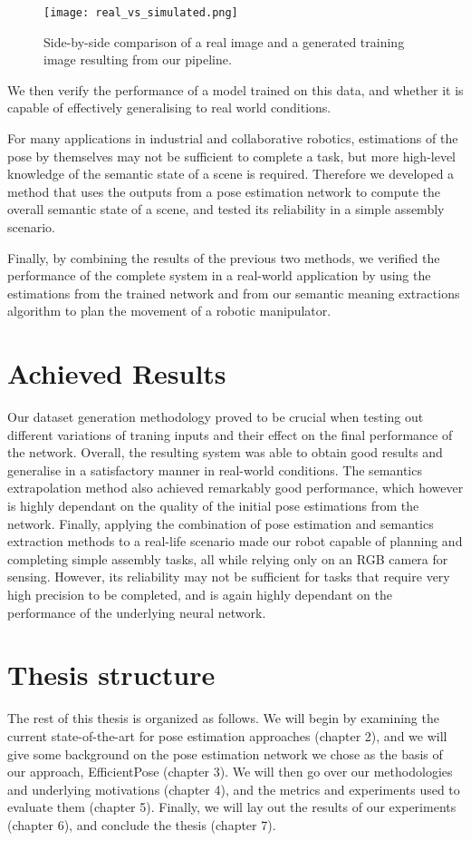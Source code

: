 \begin{figure}[ht]
    \texttt{[image: real\_vs\_simulated.png]}
    \caption{Side-by-side comparison of a real image and a generated training image resulting from our pipeline.}
\end{figure}

We then verify the performance of a model trained on this data, and whether it is capable of effectively generalising to real world conditions.

For many applications in industrial and collaborative robotics, estimations of the pose by themselves may not be sufficient to complete a task, but more high-level knowledge of the semantic state of a scene is required. Therefore we developed a method that uses the outputs from a pose estimation network to compute the overall semantic state of a scene, and tested its reliability in a simple assembly scenario.

Finally, by combining the results of the previous two methods, we verified the performance of the complete system in a real-world application by using the estimations from the trained network and from our semantic meaning extractions algorithm to plan the movement of a robotic manipulator. 

\section{Achieved Results}

Our dataset generation methodology proved to be crucial when testing out different variations of traning inputs and their effect on the final performance of the network. Overall, the resulting system was able to obtain good results and generalise in a satisfactory manner in real-world conditions. The semantics extrapolation method also achieved remarkably good performance, which however is highly dependant on the quality of the initial pose estimations from the network. Finally, applying the combination of pose estimation and semantics extraction methods to a real-life scenario made our robot capable of planning and completing simple assembly tasks, all while relying only on an RGB camera for sensing. However, its reliability may not be sufficient for tasks that require very high precision to be completed, and is again highly dependant on the performance of the underlying neural network.

\section{Thesis structure}
The rest of this thesis is organized as follows.  We will begin by examining the current state-of-the-art for pose estimation approaches (chapter 2), and we will give some background on the pose estimation network we chose as the basis of our approach, EfficientPose (chapter 3). We will then go over our methodologies and underlying motivations (chapter 4), and the metrics and experiments used to evaluate them (chapter 5). Finally, we will lay out the results of our experiments (chapter 6), and conclude the thesis (chapter 7).
